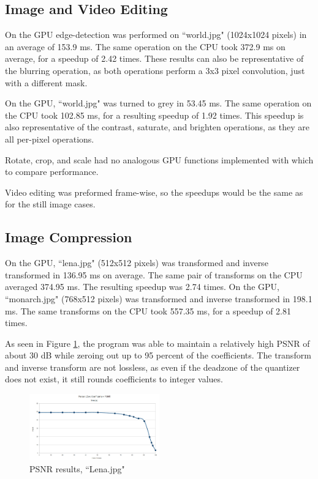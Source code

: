 \documentclass[10pt,twocolumn,twoside]{IEEEtran}
\begin{document}
\subsection{Image and Video Editing}
On the GPU edge-detection was performed on ``world.jpg" (1024x1024 pixels) in an average of 153.9 ms. The same operation on the CPU took 372.9 ms on average, for a speedup of 2.42 times. These results can also be representative of the blurring operation, as both operations perform a 3x3 pixel convolution, just with a different mask.

On the GPU, ``world.jpg" was turned to grey in 53.45 ms. The same operation on the CPU took 102.85 ms, for a resulting speedup of 1.92 times. This speedup is also representative of the contrast, saturate, and brighten operations, as they are all per-pixel operations.

Rotate, crop, and scale had no analogous GPU functions implemented with which to compare performance. 

Video editing was preformed frame-wise, so the speedups would be the same as for the still image cases.

\subsection{Image Compression}
On the GPU, ``lena.jpg" (512x512 pixels) was transformed and inverse transformed in 136.95 ms on average. The same pair of transforms on the CPU averaged 374.95 ms. The resulting speedup was 2.74 times. On the GPU, ``monarch.jpg" (768x512 pixels) was transformed and inverse transformed in 198.1 ms. The same transforms on the CPU took 557.35 ms, for a speedup of 2.81 times.

As seen in Figure \ref{fig:lena_psnr}, the program was able to maintain a relatively high PSNR of about 30 dB while zeroing out up to 95 percent of the coefficients. The transform and inverse transform are not lossless, as even if the deadzone of the quantizer does not exist, it still rounds coefficients to integer values.

\begin{figure}[htbp]
\begin{center}
\includegraphics[width=0.5\textwidth]{Images/lena_psnr_chart.jpg}
\caption{PSNR results, ``Lena.jpg"}
\label{fig:lena_psnr}
\end{center}
\end{figure}
\end{document}
